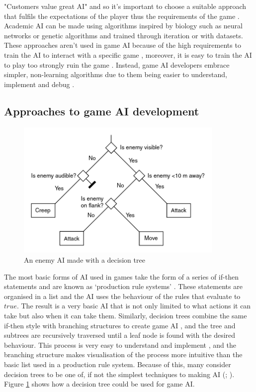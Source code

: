 \documentclass[11pt, a4paper]{report}
\begin{document}
"Customers value great AI" \parencite[60]{nareyek2004ai} and so it's important to choose a suitable approach that fulfils the expectations of the player thus the requirements of the game \parencite[19]{millington2019ai}. Academic AI can be made using algorithms inspired by biology such as neural networks or genetic algorithms and trained through iteration or with datasets. These approaches aren't used in game AI because of the high requirements to train the AI to interact with a specific game \parencite[64]{nareyek2004ai}, moreover, it is easy to train the AI to play too strongly ruin the game \parencite[13]{tozour2002evolution}. Instead, game AI developers embrace simpler, non-learning algorithms due to them being easier to understand, implement and debug \parencite[7]{tozour2002evolution}.

\subsection{Approaches to game AI development}
\label{subsec:approachesToGameAIDevelopment}

\begin{figure}[!h]
  \centering
  \includegraphics[width=10cm]{img/decision_trees.png}
  \caption{An enemy AI made with a decision tree \parencite[296]{millington2019ai}}
  \label{fig:decisionTree}
\end{figure}

The most basic forms of AI used in games take the form of a series of if-then statements and are known as `production rule systems' \parencite{tozour2002evolution}. These statements are organised in a list and the AI uses the behaviour of the rules that evaluate to $true$. The result is a very basic AI that is not only limited to what actions it can take but also when it can take them. Similarly, decision trees combine the same if-then style with branching structures to create game AI \parencite[62]{nareyek2004ai}, and the tree and subtrees are recursively traversed until a leaf node is found with the desired behaviour. This process is very easy to understand and implement \parencite[295]{millington2019ai}, and the branching structure makes visualisation of the process more intuitive than the basic list used in a production rule system. Because of this, many consider decision trees to be one of, if not the simplest techniques to making AI  (\cite[295]{millington2019ai}; \cite[7]{tozour2002evolution}). Figure \ref{fig:decisionTree} shows how a decision tree could be used for game AI.
\end{document}

